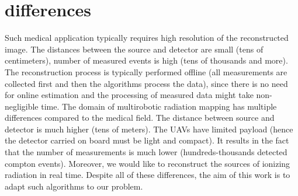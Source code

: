 {  \section{differences}
  Such medical application typically requires high resolution of the reconstructed image.
  The distances between the source and detector are small (tens of centimeters), number of measured events is high (tens of thousands and more).
  The reconstruction process is typically performed offline (all measurements are collected first and then the algorithms process the data), since there is no need for online estimation and the processing of measured data might take non-negligible time.
  The domain of multirobotic radiation mapping has multiple differences compared to the medical field.
  The distance between source and detector is much higher (tens of meters).
  The \ac{UAV}s have limited payload (hence the detector carried on board must be light and compact).
  It results in the fact that the number of measurements is much lower (hundreds-thousands detected compton events).
  Moreover, we would like to reconstruct the sources of ionizing radiation in real time.
  Despite all of these differences, the aim of this work is to adapt such algorithms to our problem.
}%

